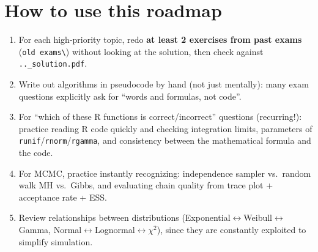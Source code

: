 \documentclass[11pt]{article}
\begin{document}
\section*{How to use this roadmap}
\begin{enumerate}[leftmargin=*]
  \item For each \textcolor{prihigh}{high-priority} topic, redo \textbf{at least 2 exercises
  from past exams} (\texttt{old exams\textbackslash}) without looking at the solution, then
  check against \texttt{..\_solution.pdf}.
  \item Write out algorithms in pseudocode by hand (not just mentally): many exam questions
  explicitly ask for ``words and formulas, not code''.
  \item For ``which of these R functions is correct/incorrect'' questions (recurring!):
  practice reading R code quickly and checking integration limits, parameters of
  \texttt{runif}/\texttt{rnorm}/\texttt{rgamma}, and consistency between the mathematical
  formula and the code.
  \item For MCMC, practice instantly recognizing: independence sampler vs.\ random walk MH
  vs.\ Gibbs, and evaluating chain quality from trace plot + acceptance rate + ESS.
  \item Review relationships between distributions
  (Exponential$\leftrightarrow$Weibull$\leftrightarrow$Gamma,
  Normal$\leftrightarrow$Lognormal$\leftrightarrow\chi^2$), since they are constantly
  exploited to simplify simulation.
\end{enumerate}
\end{document}
